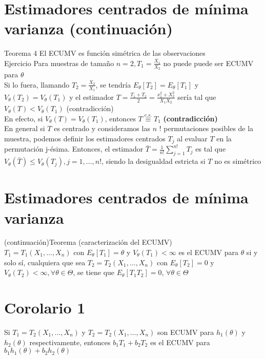 \section*{Estimadores centrados de mínima varianza (continuación)}
Teorema 4 El ECUMV es función simétrica de las observaciones\\
Ejercicio Para muestras de tamaño $n=2, T_{1}=\frac{X_{1}}{X_{2}}$ no puede puede ser ECUMV para $\theta$\\
Si lo fuera, llamando $T_{2}=\frac{X_{2}}{X_{1}}$, se tendría $E_{\theta}\left[T_{2}\right]=E_{\theta}\left[T_{1}\right]$ y\\
$V_{\theta}\left(T_{2}\right)=V_{\theta}\left(T_{1}\right)$ y el estimador $T=\frac{T_{1}+T_{2}}{2}=\frac{x_{1}^{2}+X_{2}^{2}}{X_{1} X_{2}}$ sería tal que $V_{\theta}(T)<V_{\theta}\left(T_{1}\right)$ (contradicción)\\
En efecto, si \( V_{\theta}(T) = V_{\theta}(T_1) \), entonces \( T \overset{c.s.}{\equiv} T_1 \) \textbf{(contradicción)}\\
En general si $T$ es centrado y consideramos las $n$ ! permutaciones posibles de la muestra, podemos definir los estimadores centrados $T_{j}$ al evaluar $T$ en la permutación j-ésima. Entonces, el estimador $\bar{T}=\frac{1}{n!} \sum_{j=1}^{n!} T_{j}$ es tal que $V_{\theta}(\bar{T}) \leq V_{\theta}\left(T_{j}\right), j=1, \ldots, n!$, siendo la desigualdad estricta si $T$ no es simétrico

\section*{Estimadores centrados de mínima varianza}
 (continuación)Teorema (caracterización del ECUMV)\\
$T_{1}=T_{1}\left(X_{1}, \ldots, X_{n}\right)$ con $E_{\theta}\left[T_{1}\right]=\theta$ y $V_{\theta}\left(T_{1}\right)<\infty$ es el ECUMV para $\theta$ si y solo sí, cualquiera que sea $T_{2}=T_{2}\left(X_{1}, \ldots, X_{n}\right)$ con $E_{\theta}\left[T_{2}\right]=0$ y $V_{\theta}\left(T_{2}\right)<\infty, \forall \theta \in \Theta$, se tiene que $E_{\theta}\left[T_{1} T_{2}\right]=0$, $\forall \theta \in \Theta$

\section*{Corolario 1}
Si $T_{1}=T_{2}\left(X_{1}, \ldots, X_{n}\right)$ y $T_{2}=T_{2}\left(X_{1}, \ldots, X_{n}\right)$ son ECUMV para $h_{1}(\theta)$ y $h_{2}(\theta)$ respectivamente, entonces $b_{1} T_{1}+b_{2} T_{2}$ es el ECUMV para $b_{1} h_{1}(\theta)+b_{2} h_{2}(\theta)$

